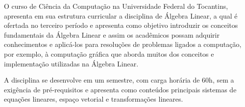 \noindent O curso de Ciência da Computação na Universidade Federal do Tocantins, apresenta em sua estrutura curricular a disciplina de Álgebra Linear, a qual é ofertada no terceiro período e apresenta como objetivo introduzir os conceitos fundamentais da Álgebra Linear e assim os acadêmicos possam adquirir conhecimentos e aplicá-los para resoluções de problemas ligados a computação, por exemplo, à computação gráfica que aborda muitos dos conceitos e implementação utilizadas na Álgebra Linear.

A disciplina se desenvolve em um semestre, com carga horária de 60h, sem a exigência de pré-requisitos e apresenta como conteúdos principais sistemas de equações lineares, espaço vetorial e transformações lineares.
